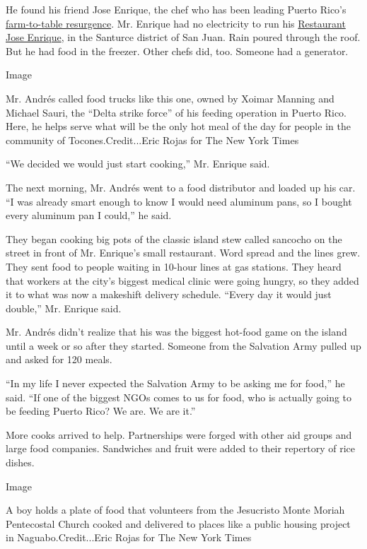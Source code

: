 He found his friend Jose Enrique, the chef who has been leading Puerto
Rico's
\href{https://www.nytimes3xbfgragh.onion/2015/02/18/dining/reclaiming-puerto-ricos-food-paradise.html}{farm-to-table
resurgence}. Mr. Enrique had no electricity to run his
\href{http://joseenriquepr.com/}{Restaurant Jose Enrique}, in the
Santurce district of San Juan. Rain poured through the roof. But he had
food in the freezer. Other chefs did, too. Someone had a generator.

Image

Mr. Andrés called food trucks like this one, owned by Xoimar Manning and
Michael Sauri, the ``Delta strike force'' of his feeding operation in
Puerto Rico. Here, he helps serve what will be the only hot meal of the
day for people in the community of Tocones.Credit...Eric Rojas for The
New York Times

``We decided we would just start cooking,'' Mr. Enrique said.

The next morning, Mr. Andrés went to a food distributor and loaded up
his car. ``I was already smart enough to know I would need aluminum
pans, so I bought every aluminum pan I could,'' he said.

They began cooking big pots of the classic island stew called sancocho
on the street in front of Mr. Enrique's small restaurant. Word spread
and the lines grew. They sent food to people waiting in 10-hour lines at
gas stations. They heard that workers at the city's biggest medical
clinic were going hungry, so they added it to what was now a makeshift
delivery schedule. ``Every day it would just double,'' Mr. Enrique said.

Mr. Andrés didn't realize that his was the biggest hot-food game on the
island until a week or so after they started. Someone from the Salvation
Army pulled up and asked for 120 meals.

``In my life I never expected the Salvation Army to be asking me for
food,'' he said. ``If one of the biggest NGOs comes to us for food, who
is actually going to be feeding Puerto Rico? We are. We are it.''

More cooks arrived to help. Partnerships were forged with other aid
groups and large food companies. Sandwiches and fruit were added to
their repertory of rice dishes.

Image

A boy holds a plate of food that volunteers from the Jesucristo Monte
Moriah Pentecostal Church cooked and delivered to places like a public
housing project in Naguabo.Credit...Eric Rojas for The New York Times

